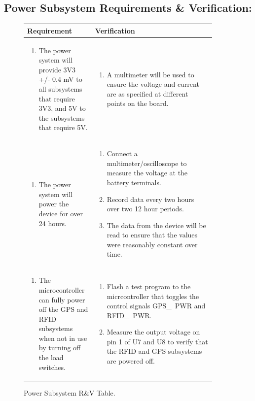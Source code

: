 \documentclass{article}
\begin{document}
\subsection{Power Subsystem Requirements \& Verification:}

\begin{figure}[H]
	\begin{center}
		\begin{tabular}{|p{0.3 \linewidth}|p{0.6 \linewidth}|}
			\hline
			Requirement & Verification  \\
			\hline
			\begin{enumerate}
				\item The power system will provide 3V3 +/- 0.4 mV to all subsystems that require 3V3, and 5V to the subsystems that require 5V. 
			\end{enumerate}  & \begin{enumerate} 
				\item A multimeter will be used to ensure the voltage and current are as specified at different points on the board.
			\end{enumerate}
			\\
			\hline
			\begin{enumerate}
				\item The power system will power the device for over 24 hours. 
			\end{enumerate}  & \begin{enumerate}
				\item Connect a multimeter/oscilloscope to measure the voltage at the battery terminals. 
				\item Record data every two hours over two 12 hour periods. 
				\item The data from the device will be read to ensure that the values were reasonably constant over time.
			\end{enumerate} \\
			\hline
			\begin{enumerate}
				\item The microcontroller can fully power off the GPS and RFID subsystems when not in use by turning off the load switches. 
			\end{enumerate}  & \begin{enumerate}
				\item Flash a test program to the micrcontroller that toggles the control signals GPS\_~PWR and RFID\_~PWR. 
				\item Measure the output voltage on pin 1 of U7 and U8 to verify that the RFID and GPS subsystems are powered off. 
			\end{enumerate} \\
			\hline
		\end{tabular}
	\end{center}
	\caption{Power Subsystem R\&V Table.}
\end{figure}
\end{document}
